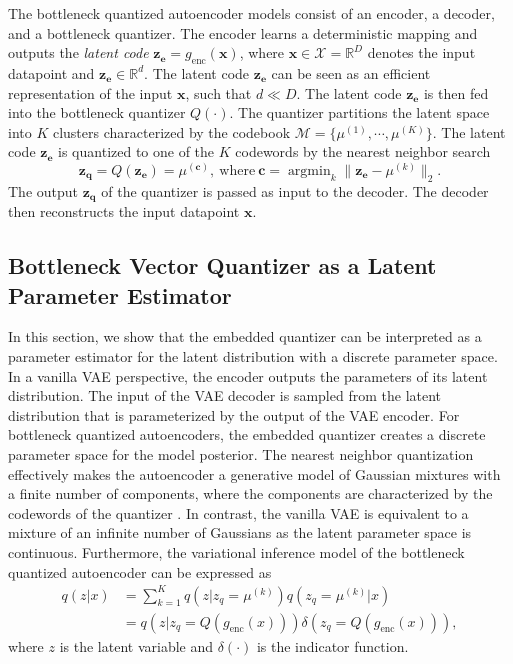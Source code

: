 \documentclass[letterpaper]{article} %
\DeclareMathOperator*{\argmin}{arg\min}
\begin{document}
The bottleneck quantized autoencoder models consist of an encoder, a decoder, and a bottleneck quantizer. The encoder learns a deterministic mapping and outputs the \emph{latent code} $\mathbf{z_e} = g_{\text{enc}}(\mathbf{x})$, where $\mathbf{x} \in \mathcal{X} = \mathbb{R}^{D}$ denotes the input datapoint and $\mathbf{z_e} \in \mathbb{R}^{d}$. The latent code $\mathbf{z_e}$ can be seen as an efficient representation of the input $\mathbf{x}$, such that $d \ll D$. The latent code $\mathbf{z_e}$ is then fed into the bottleneck quantizer $Q(\cdot)$. The quantizer partitions the latent space into $K$ clusters characterized by the codebook $\mathcal{M}  = \{\mu^{(1)}, \cdots, \mu^{(K)}\}$. The latent code $\mathbf{z_e}$ is quantized to one of the $K$ codewords by the nearest neighbor search
\begin{equation}
\label{eq:assgn1}
\mathbf{z_q} = Q(\mathbf{z_e}) = \mu^{(\mathbf{c})}, \ \text{where} \ \mathbf{c} = \argmin_k\|\mathbf{z_e}-\mu^{(k)}\|_2.
\end{equation}
The output $\mathbf{z_q}$ of the quantizer is passed as input to the decoder. The decoder then reconstructs the input datapoint $\mathbf{x}$.
\subsection{Bottleneck Vector Quantizer as a Latent Parameter Estimator}
In this section, we show that the embedded quantizer can be interpreted as a parameter estimator for the latent distribution with a discrete parameter space. In a vanilla VAE perspective, the encoder outputs the parameters of its latent distribution. The input of the VAE decoder is sampled from the latent distribution that is parameterized by the output of the VAE encoder. For bottleneck quantized autoencoders, the embedded quantizer creates a discrete parameter space for the model posterior. The nearest neighbor quantization effectively makes the autoencoder a generative model of Gaussian mixtures with a finite number of components, where the components are characterized by the codewords of the quantizer \cite{Henter2018}. In contrast, the vanilla VAE is equivalent to a mixture of an infinite number of Gaussians as the latent parameter space is continuous. Furthermore, the variational inference model of the bottleneck quantized autoencoder can be expressed as
\begin{align}
q(z|x) &= \sum_{k = 1}^Kq\left(z|z_q = \mu^{(k)}\right)q\left(z_q = \mu^{(k)}|x\right) \\
&= q\left(z|z_q = Q(g_{\text{enc}}(x))\right)\delta\left(z_q = Q(g_{\text{enc}}(x))\right),
\end{align}
where $z$ is the latent variable and $\delta(\cdot)$ is the indicator function.
\end{document}
